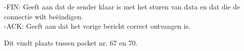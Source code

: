 -FIN: Geeft aan dat de sender klaar is met het sturen van data en dat die de connectie wilt beëindigen.\\
-ACK: Geeft aan dat het vorige bericht correct ontvangen is.

Dit vindt plaats tussen packet nr. 67 en 70.